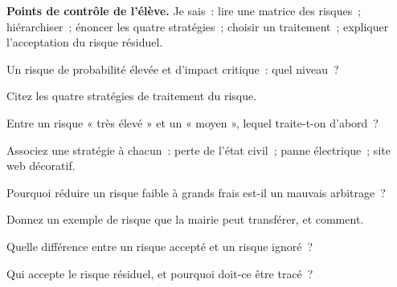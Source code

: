 \begin{boxinfo}
\textbf{Points de contrôle de l'élève.} Je sais~: lire une matrice des
risques~; hiérarchiser~; énoncer les quatre stratégies~; choisir un
traitement~; expliquer l'acceptation du risque résiduel.
\end{boxinfo}

\bigskip

\begin{boxexo}[title={\ding{45}\quad Exercice~13.1. Lire la matrice \niveaubase}]
Un risque de probabilité élevée et d'impact critique~: quel niveau~?
\end{boxexo}

\begin{boxexo}[title={\ding{45}\quad Exercice~13.2. Les stratégies \niveaubase}]
Citez les quatre stratégies de traitement du risque.
\end{boxexo}

\begin{boxexo}[title={\ding{45}\quad Exercice~13.3. Hiérarchiser \niveaubase}]
Entre un risque « très élevé » et un « moyen », lequel traite-t-on d'abord~?
\end{boxexo}

\begin{boxexo}[title={\ding{45}\quad Exercice~13.4. Associer \niveaumoyen}]
Associez une stratégie à chacun~: perte de l'état civil~; panne électrique~;
site web décoratif.
\end{boxexo}

\begin{boxexo}[title={\ding{45}\quad Exercice~13.5. Coût-gain \niveaumoyen}]
Pourquoi réduire un risque faible à grands frais est-il un mauvais arbitrage~?
\end{boxexo}

\begin{boxexo}[title={\ding{45}\quad Exercice~13.6. Transférer \niveaumoyen}]
Donnez un exemple de risque que la mairie peut transférer, et comment.
\end{boxexo}

\begin{boxexo}[title={\ding{45}\quad Exercice~13.7. Accepter ou ignorer \niveaumoyen}]
Quelle différence entre un risque accepté et un risque ignoré~?
\end{boxexo}

\begin{boxexo}[title={\ding{45}\quad Exercice~13.8. Résiduel \niveaumoyen}]
Qui accepte le risque résiduel, et pourquoi doit-ce être tracé~?
\end{boxexo}

